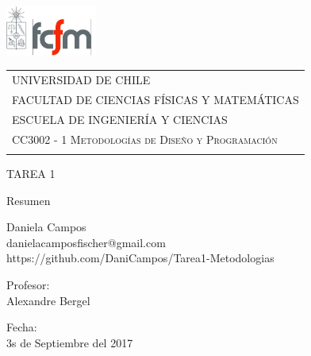 \begin{titlepage}
  \includegraphics[width=3cm]{logo.png} 
	\hspace{0cm}
  \begin{tabular}{l}
   \small \scshape{UNIVERSIDAD DE CHILE} \\
 	\small \scshape{FACULTAD DE CIENCIAS FÍSICAS Y MATEMÁTICAS} \\
 	\small \scshape {ESCUELA DE INGENIERÍA Y CIENCIAS} \\
 	\small \scshape{CC3002 - 1 Metodologías de Diseño y Programación} \\
  \vspace*{0.5cm}\mbox{}
  \end{tabular}

\vspace*{3.5 cm}
  
\begin{center}
\fontsize{8mm}{9mm}\selectfont 
	TAREA 1
	
	Resumen

	\vspace*{0.8 cm}
  

\vspace*{3.5 cm}

	\normalsize{Daniela Campos} \\
	\normalsize{danielacamposfischer@gmail.com}\\
	\normalsize{https://github.com/DaniCampos/Tarea1-Metodologias}




	\vspace{0.5 cm}

	
	\footnotesize{Profesor:} \\
	\vspace{0.08 cm}
	\normalsize{Alexandre Bergel} \\
	
	\vspace{0.5 cm}

	

	\footnotesize{Fecha:} \\
	\vspace{0.08 cm}
	\normalsize{3s de Septiembre del 2017} \\


\end{center}

\end{titlepage}

%